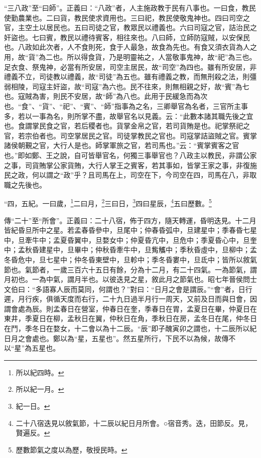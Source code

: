 {\noindent\shu{}\fzkt “三八政”至“曰師”。正義曰：“八政”者，人主施政教于民有八事也。一曰食，教民使勤農業也。二曰貨，教民使求資用也。三曰祀，教民使敬鬼神也。四曰司空之官，主空土以居民也。五曰司徒之官，教眾民以禮義也。六曰司寇之官，詰治民之奸盜也。七曰賓，教民以禮待賓客，相往來也。八曰師，立師防寇賊，以安保民也。八政如此次者，人不食則死，食于人最急，故食為先也。有食又須衣貨為人之用，故“貨”為二也。所以得食貨，乃是明靈祐之，人當敬事鬼神，故“祀”為三也。足衣食、祭鬼神，必當有所安居，司空主居民，故“司空”為四也。雖有所安居，非禮義不立，司徒教以禮義，故“司徒”為五也。雖有禮義之教，而無刑殺之法，則彊弱相陵，司寇主奸盜，故“司寇”為六也。民不往來，則無相親之好，故“賓”為七也。寇賊為害，則民不安居，故“師”為八也。此用于民緩急而為次也。“食”、“貨”、“祀”、“賓”、“師”指事為之名，三卿舉官為名者，三官所主事多，若以一事為名，則所掌不盡，故舉官名以見義。云：“此數本諸其職先後之宜也。食謂掌民食之官，若后稷者也。貨掌金帛之官，若司貨賄是也。祀掌祭祀之官，若宗伯者也。司空掌居民之官。司徒掌教民之官也。司寇掌詰盜賊之官。賓掌諸侯朝覲之官，大行人是也。師掌軍旅之官，若司馬也。”云：“賓掌賓客之官也。”即如鄭、王之說，自可皆舉官名，何獨三事舉官也？八政主以教民，非謂公家之事，司貨賄掌公家貨賄，大行人掌王之賓客，若其事如，皆掌王家之事，非復施民之政，何以謂之“政”乎？且司馬在上，司空在下，今司空在四，司馬在八，非取職之先後也。 \par}

“四，五紀。一曰歲，\footnote{所以紀四時。}二曰月，\footnote{所以紀一月。}三曰日，\footnote{紀一日。}四曰星辰，\footnote{二十八宿迭見以敘氣節，十二辰以紀日月所會。○宿音秀。迭，田節反。見，賢遍反。}五曰歷數。\footnote{歷數節氣之度以為歷，敬授民時。}

{\noindent\zhuan{}\fzbyks 傳“二十”至“所會”。正義曰：二十八宿，佈于四方，隨天轉運，昏明迭見。十二月皆紀昏旦所中之星。若孟春昏參中，旦尾中；仲春昏弧中，旦建星中；季春昏七星中，旦牽牛中；孟夏昏翼中，旦婺女中；仲夏昏亢中，旦危中；季夏昏心中，旦奎中；孟秋昏建星中，旦畢中；仲秋昏牽牛中，旦觜觿中；季秋昏虛中，旦柳中；孟冬昏危中，旦七星中；仲冬昏東壁中，旦軫中；季冬昏婁中，旦氐中；皆所以敘氣節也。氣節者，一歲三百六十五日有餘，分為十二月，有二十四氣。一為節氣，謂月初也。一為中氣，謂月半也。以彼迭見之星，敘此月之節氣也。昭七年晉侯問士文伯曰：“多語寡人辰而莫同，何謂也？”對曰：“日月之會是謂辰。”“會”者，日行遲，月行疾，俱循天度而右行，二十九日過半月行一周天，又前及日而與日會，因謂會處為辰。則孟春日在營室，仲春日在奎，季春日在胃，孟夏日在畢，仲夏日在東井，季夏日在柳，孟秋日在翼，仲秋日在角，季秋日在房，孟冬日在尾，仲冬日在鬥，季冬日在婺女，十二會以為十二辰。“辰”即子醜寅卯之謂也，十二辰所以紀日月之會處也。鄭以為“星，五星也”。然五星所行，下民不以為候，故傳不以“星”為五星也。 \par}

